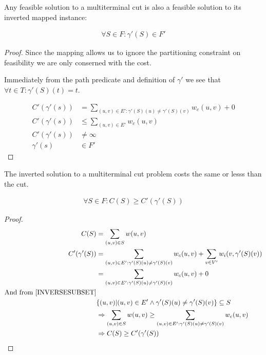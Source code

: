 \documentclass{article}
\begin{document}
\begin{lemma}
\label{INVERSEFEASIBLE}
Any feasible solution to a multiterminal cut is also a feasible solution to its inverted mapped instance:

\begin{align}
	\nonumber \forall S \in F : \gamma'(S) \in F'
\end{align}
\end{lemma}
\begin{proof}
Since the mapping allows us to ignore the partitioning constraint on feasibility we are only conserned with the cost.

Immediately from the path predicate and definition of $\gamma'$ we see that $\forall t \in T : \gamma'(S)(t) = t$.

\begin{align}
	\nonumber C'(\gamma'(s)) & = \displaystyle\sum\limits_{(u,v) \in E' : \gamma'(S)(u) \neq \gamma'(S)(v)} w_c(u,v) + 0 \\
	\nonumber C'(\gamma'(s)) & \leq \displaystyle\sum\limits_{(u,v) \in E'} w_c(u,v) \\
	\nonumber C'(\gamma'(s)) & \neq \infty \\
	\nonumber \gamma'(s) & \in F'
\end{align}
\end{proof}

\begin{lemma}
\label{INVERSECOST}
The inverted solution to a multiterminal cut problem costs the same or lesss than the cut.

\begin{align}
	\nonumber \forall S \in F : C(S) \geq C'(\gamma'(S))
\end{align}
\end{lemma}
\begin{proof}
\begin{align}
	\nonumber C(S) & = \displaystyle\sum\limits_{(u,v) \in S} w(u,v)\\
	\nonumber C'(\gamma'(S)) & = \displaystyle\sum\limits_{(u,v) \in E' : \gamma'(S)(u) \neq \gamma'(S)(v)} w_c(u,v) + \displaystyle\sum\limits_{v \in V'} w_i(v, \gamma'(S)(v)) \\
	\nonumber & = \displaystyle\sum\limits_{(u,v) \in E' : \gamma'(S)(u) \neq \gamma'(S)(v)} w_c(u,v) + 0 \\
	\nonumber \mbox{And from \ref{INVERSESUBSET}} \\
	\nonumber & \{(u,v) | (u,v) \in E' \wedge \gamma'(S)(u) \neq \gamma'(S)(v)\} \subseteq S \\
	\nonumber & \Rightarrow \displaystyle\sum\limits_{(u,v) \in S} w(u,v) \geq \displaystyle\sum\limits_{(u,v) \in E' : \gamma'(S)(u) \neq \gamma'(S)(v)} w_c(u,v) \\
	\nonumber & \Rightarrow C(S) \geq C'(\gamma'(S))
\end{align}
\end{proof}
\end{document}

